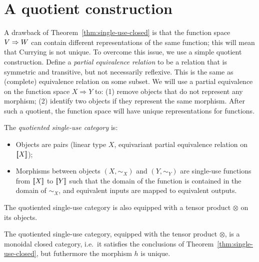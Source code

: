 
\section{A quotient construction}
\label{sec:quotient-category}
A drawback of Theorem~\ref{thm:single-use-closed} is that the function space $V \Rightarrow W$ can contain different representations of the same function; this will mean that Currying is not unique. To overcome this issue, we use a simple quotient construction. 
Define a \emph{partial equivalence relation} to be a relation that is symmetric and transitive, but not necessarily reflexive.  This is the same as (complete) equivalence relation on some subset. We will use a partial equivalence on the function space $X \Rightarrow Y$ to: (1)
 remove objects that do not represent any morphism; (2) identify two objects if they represent the same morphism. After such a quotient, the function space will have unique representations for functions. 




\begin{definition}
    The \emph{quotiented single-use category} is: 
    \begin{itemize}
    \item Objects are pairs (linear type $X$, equivariant partial equivalence relation on $[{\kern-0.45ex}[X]{\kern-0.45ex}]$);
    \item Morphisms between objects $(X,\sim_X)$ and $(Y,\sim_Y)$ are single-use functions from $[{\kern-0.45ex}[X]{\kern-0.45ex}]$ to $[{\kern-0.45ex}[Y]{\kern-0.45ex}]$ such that the domain of the function is contained in the domain of $\sim_X$, and equivalent inputs are mapped to equivalent outputs.
    \end{itemize}
\end{definition}

The quotiented single-use category is also equipped with a tensor product $\otimes$ on its objects.
\begin{theorem}
    The quotiented single-use category, equipped with the tensor product $\otimes$, is a monoidal closed category, i.e.~it satisfies the conclusions of Theorem~\ref{thm:single-use-closed}, but futhermore the morphism $h$ is unique.
\end{theorem}

